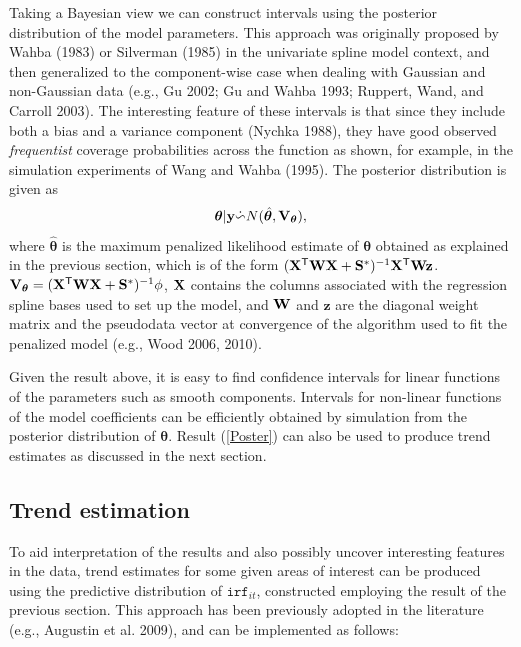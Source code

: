 \documentclass[10pt]{article}
\newcommand{\beq}{\begin{equation}}
\newcommand{\eeq}{\end{equation}}
\newcommand{\ts}{^{\sf T}}
\newcommand{\X}{{\bf X}}
\theoremstyle{definition}
\theoremstyle{plain}
\begin{document}
Taking a Bayesian view we can construct intervals using the posterior distribution of the model parameters. This approach was originally proposed by Wahba (1983) or Silverman (1985) in the univariate spline model context, and then generalized to the component-wise case when dealing with Gaussian and non-Gaussian data (e.g., Gu 2002; Gu and Wahba 1993; Ruppert, Wand, and Carroll 2003). The interesting feature of these intervals is that since they include both a bias and a variance component (Nychka 1988), they have good observed \textit{frequentist} coverage probabilities across the function as shown, for example, in the simulation experiments of Wang and Wahba (1995). The posterior distribution is given as
\beq
\bm\theta|{\bf y} \dot{\backsim} N( \hat{\bm\theta}, {\bf V}_{\bm\theta} ),
\label{Poster}
\eeq
where $\hat{\bm\theta}$ is the maximum penalized likelihood estimate of $\bm\theta$ obtained as explained in the previous section, which is of the form $(\X\ts{\bf W}\X+{\bf S}^*)^{-1}\X\ts{\bf W}{\bf z}$. ${\bf V}_{\bm\theta} = (\X\ts{\bf W}\X+{\bf S}^*)^{-1}\phi$, $\X$ contains the columns associated with the regression spline bases used to set up the model, and ${\bf W}$ and $\mathbf{z}$ are the diagonal weight matrix and the pseudodata vector at convergence of the algorithm used to fit the penalized model (e.g., Wood 2006, 2010).

Given the result above, it is easy to find confidence intervals for linear functions of the parameters such as smooth components. Intervals for non-linear functions of the model coefficients can be efficiently obtained by simulation from the posterior distribution of $\bm\theta$. Result (\ref{Poster}) can also be used to produce trend estimates as discussed in the next section.

\subsection{Trend estimation \label{TE}}
To aid interpretation of the results and also possibly uncover interesting features in the data, trend estimates for some given areas of interest can be produced using the predictive distribution of $\texttt{irf}_{it}$, constructed employing the result of the previous section. This approach has been previously adopted in the literature (e.g., Augustin et al. 2009), and can be implemented as follows:
\end{document}
